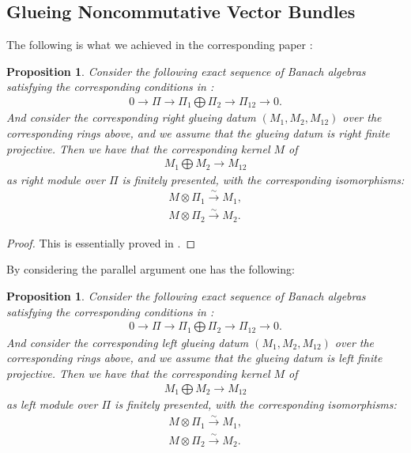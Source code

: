 \documentclass[12pt]{amsart}
\newtheorem{proposition}[theorem]{Proposition}
\theoremstyle{definition}
\numberwithin{equation}{section}
\begin{document}
\subsection{Glueing Noncommutative Vector Bundles}



\indent The following is what we achieved in the corresponding paper \cite[Lemma 6.82]{T2}:

\begin{proposition}
Consider the following exact sequence of Banach algebras satisfying the corresponding conditions in \cite[Definition 2.7.3 (a),(b)]{KL1}:
\begin{align}
0\rightarrow {\Pi}\rightarrow \Pi_1\bigoplus \Pi_2\rightarrow \Pi_{12}\rightarrow 0.	
\end{align}
And consider the corresponding right glueing datum $(M_1,M_2,M_{12})$ over the corresponding rings above, and we assume that the glueing datum is right finite projective. Then we have that the corresponding kernel $M$ of
\begin{align}
M_1\bigoplus M_2\rightarrow M_{12}	
\end{align}
as right module over $\Pi$ is finitely presented, with the corresponding isomorphisms:
\begin{align}
M\otimes \Pi_1 \overset{\sim}{\rightarrow}	M_1,\\
M\otimes \Pi_2 \overset{\sim}{\rightarrow}	M_2.
\end{align}

\end{proposition}


\begin{proof}
This is essentially proved in \cite[Lemma 6.82]{T2}.	
\end{proof}


	
\indent By considering the parallel argument one has the following:

\begin{proposition}
Consider the following exact sequence of Banach algebras satisfying the corresponding conditions in \cite[Definition 2.7.3 (a),(b)]{KL1}:
\begin{align}
0\rightarrow {\Pi}\rightarrow \Pi_1\bigoplus \Pi_2\rightarrow \Pi_{12}\rightarrow 0.	
\end{align}
And consider the corresponding left glueing datum $(M_1,M_2,M_{12})$ over the corresponding rings above, and we assume that the glueing datum is left finite projective. Then we have that the corresponding kernel $M$ of
\begin{align}
M_1\bigoplus M_2\rightarrow M_{12}	
\end{align}
as left module over $\Pi$ is finitely presented, with the corresponding isomorphisms:
\begin{align}
M\otimes \Pi_1 \overset{\sim}{\rightarrow}	M_1,\\
M\otimes \Pi_2 \overset{\sim}{\rightarrow}	M_2.
\end{align}

\end{proposition}
\end{document}
